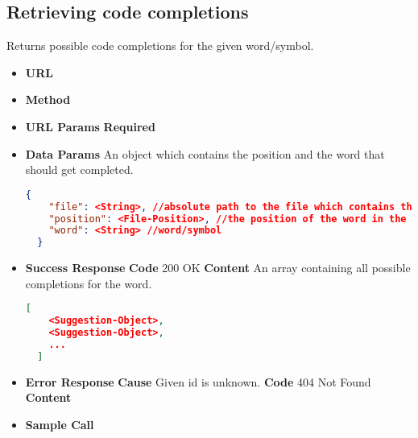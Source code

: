 \subsection{Retrieving code completions}
Returns possible code completions for the given word/symbol.

\begin{itemize}
\item \textbf{URL} 
\item \textbf{Method} 

\item \textbf{URL Params}
  \newline\textbf{Required} 

\item \textbf{Data Params} An object which contains the position and the word that should get completed.
  \begin{lstlisting}[basicstyle=\small,language=json]
  {
    "file": <String>, //absolute path to the file which contains the word/symbol
    "position": <File-Position>, //the position of the word in the file
    "word": <String> //word/symbol
  }
  \end{lstlisting}

\item \textbf{Success Response}
  \newline\textbf{Code} 200 OK
  \newline\textbf{Content} An array containing all possible completions for the word.
  \begin{lstlisting}[basicstyle=\small,language=json]
  [
    <Suggestion-Object>,
    <Suggestion-Object>,
    ...
  ]
  \end{lstlisting}

\item \textbf{Error Response}
  \newline\textbf{Cause} Given id is unknown.
  \newline\textbf{Code} 404 Not Found
  \newline\textbf{Content} 

\item \textbf{Sample Call}
\end{itemize}

